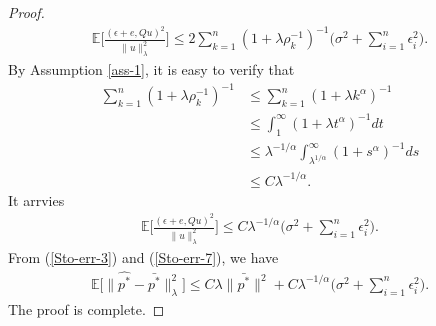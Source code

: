 \documentclass[10pt,a4paper]{amsart}
\begin{document}
\begin{proof}
\begin{align*}
\mathbb{E}\bigg[\frac{(\epsilon+e,Qu)^2}{\| u\|_{\lambda}^2}\bigg]
\leq 2\sum_{k=1}^n(1+\lambda\rho_k^{-1})^{-1}\bigg(\sigma^2+\sum_{i=1}^n\epsilon_i^2\bigg).
\end{align*}
By Assumption \ref{ass-1}, it is easy to verify that
\begin{align*}
\sum_{k=1}^n(1+\lambda\rho_k^{-1})^{-1}
&\leq \sum_{k=1}^n(1+\lambda k^{\alpha})^{-1}\\
&\leq \int_1^{\infty}(1+\lambda t^{\alpha})^{-1}dt\\
&\leq \lambda^{-1/\alpha}\int_{\lambda^{1/\alpha}}^{\infty}(1+ s^{\alpha})^{-1}ds\\
&\leq C\lambda^{-1/\alpha}.
\end{align*}
It arrvies 
\begin{align}\label{Sto-err-7}
\mathbb{E}\bigg[\frac{(\epsilon+e,Qu)^2}{\| u\|_{\lambda}^2}\bigg]
\leq C\lambda^{-1/\alpha}\bigg(\sigma^2+\sum_{i=1}^n\epsilon_i^2\bigg).
\end{align}
From (\ref{Sto-err-3}) and (\ref{Sto-err-7}), we have
\begin{align*}
\mathbb{E}\big[\| \hat{p^*}-\bar{p^*}\|_{\lambda}^2\big]\leq C\lambda\|\bar{p^*}\|^2+C\lambda^{-1/\alpha}\bigg(\sigma^2+\sum_{i=1}^n\epsilon_i^2\bigg).
\end{align*}
The proof is complete. 
\end{proof} 
\end{document}
